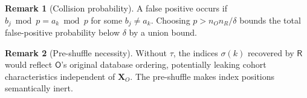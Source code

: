 \documentclass[12pt]{article}
\theoremstyle{definition}
\newtheorem{remark}{Remark}[section]
\theoremstyle{plain}
\newcommand{\Party}[1]{\textsf{#1}}
\begin{document}
\begin{remark}[Collision probability]
\label{rem:collision}
A false positive occurs if $b_j \bmod p = a_k \bmod p$ for some
$b_j \neq a_k$. Choosing $p > n_O n_R / \delta$ bounds the total
false-positive probability below $\delta$ by a union bound.
\end{remark}

\begin{remark}[Pre-shuffle necessity]
\label{rem:shuffle}
Without $\tau$, the indices $\sigma(k)$ recovered by $\Party{R}$ would
reflect $\Party{O}$'s original database ordering, potentially leaking
cohort characteristics independent of $\mathbf{X}_O$. The pre-shuffle
makes index positions semantically inert.
\end{remark}
\end{document}
